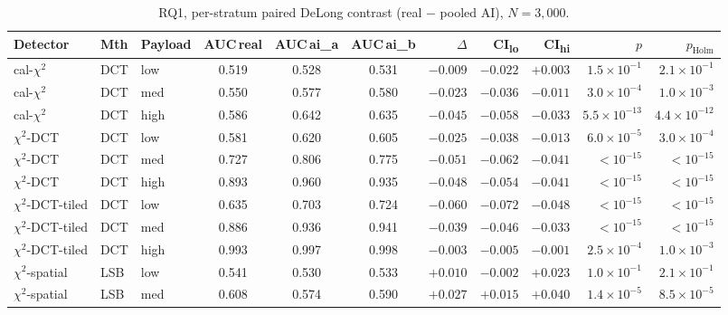 \documentclass[10pt,twocolumn,a4paper]{article}
\begin{document}
\begin{table}[h]
\centering\footnotesize
\caption{RQ1, per-stratum paired DeLong contrast (real $-$ pooled AI), $N\!=\!3{,}000$.}
\label{tab:appendix-rq1}
\setlength{\tabcolsep}{4pt}\renewcommand{\arraystretch}{1.1}
\begin{tabular}{@{}l l l c c c r r r r r@{}}
\toprule
\textbf{Detector} & \textbf{Mth} & \textbf{Payload} & \textbf{AUC\,real} & \textbf{AUC\,ai\_a} & \textbf{AUC\,ai\_b} & \textbf{$\Delta$} & \textbf{CI\textsubscript{lo}} & \textbf{CI\textsubscript{hi}} & \textbf{$p$} & \textbf{$p_\text{Holm}$} \\
\midrule
cal-$\chi^2$         & DCT & low    & 0.519 & 0.528 & 0.531 & $-0.009$ & $-0.022$ & $+0.003$ & $1.5\!\times\!10^{-1}$ & $2.1\!\times\!10^{-1}$ \\
cal-$\chi^2$         & DCT & med    & 0.550 & 0.577 & 0.580 & $-0.023$ & $-0.036$ & $-0.011$ & $3.0\!\times\!10^{-4}$ & $1.0\!\times\!10^{-3}$ \\
cal-$\chi^2$         & DCT & high   & 0.586 & 0.642 & 0.635 & $-0.045$ & $-0.058$ & $-0.033$ & $5.5\!\times\!10^{-13}$ & $4.4\!\times\!10^{-12}$ \\
$\chi^2$-DCT         & DCT & low    & 0.581 & 0.620 & 0.605 & $-0.025$ & $-0.038$ & $-0.013$ & $6.0\!\times\!10^{-5}$ & $3.0\!\times\!10^{-4}$ \\
$\chi^2$-DCT         & DCT & med    & 0.727 & 0.806 & 0.775 & $-0.051$ & $-0.062$ & $-0.041$ & $<\!10^{-15}$           & $<\!10^{-15}$ \\
$\chi^2$-DCT         & DCT & high   & 0.893 & 0.960 & 0.935 & $-0.048$ & $-0.054$ & $-0.041$ & $<\!10^{-15}$           & $<\!10^{-15}$ \\
$\chi^2$-DCT-tiled   & DCT & low    & 0.635 & 0.703 & 0.724 & $-0.060$ & $-0.072$ & $-0.048$ & $<\!10^{-15}$           & $<\!10^{-15}$ \\
$\chi^2$-DCT-tiled   & DCT & med    & 0.886 & 0.936 & 0.941 & $-0.039$ & $-0.046$ & $-0.033$ & $<\!10^{-15}$           & $<\!10^{-15}$ \\
$\chi^2$-DCT-tiled   & DCT & high   & 0.993 & 0.997 & 0.998 & $-0.003$ & $-0.005$ & $-0.001$ & $2.5\!\times\!10^{-4}$ & $1.0\!\times\!10^{-3}$ \\
$\chi^2$-spatial     & LSB & low    & 0.541 & 0.530 & 0.533 & $+0.010$ & $-0.002$ & $+0.023$ & $1.0\!\times\!10^{-1}$ & $2.1\!\times\!10^{-1}$ \\
$\chi^2$-spatial     & LSB & med    & 0.608 & 0.574 & 0.590 & $+0.027$ & $+0.015$ & $+0.040$ & $1.4\!\times\!10^{-5}$ & $8.5\!\times\!10^{-5}$ \\

\end{tabular}
\end{table}
\end{document}

